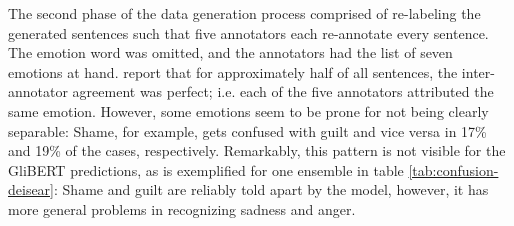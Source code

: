 The second phase of the data generation process comprised of re-labeling the generated sentences
such that five annotators each re-annotate every sentence. The emotion word was omitted, and
the annotators had the list of seven emotions at hand. \citeauthor{troiano2019crowdsourcing}
report that for approximately half of all sentences, the inter-annotator agreement was perfect;
i.e. each of the five annotators attributed the same emotion. However, some emotions seem to
be prone for not being clearly separable: Shame, for example, gets confused with guilt and vice versa
in 17\% and 19\% of the cases, respectively. Remarkably, this pattern is not visible for the GliBERT
predictions, as is exemplified for one ensemble in table \ref{tab:confusion-deisear}: Shame and guilt
are reliably told apart by the model, however, it has more general problems in recognizing
sadness and anger.


